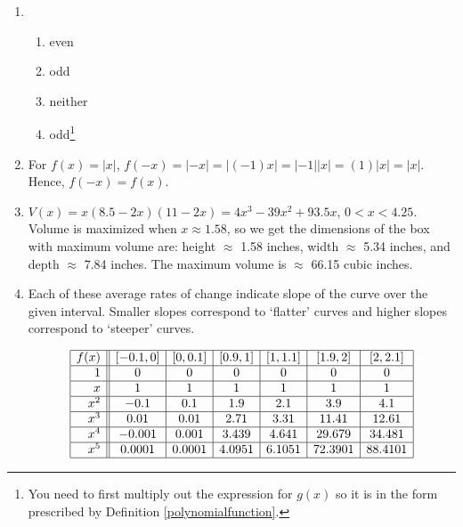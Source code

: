 \documentclass{ximera}
\begin{document}
\begin{enumerate}
\setcounter{enumi}{\value{HW}}

\addtocounter{enumi}{1}

\item  %
\begin{enumerate}

\item even

\item  odd

\item  neither

\item  odd\footnote{You need to first multiply out the expression for $g(x)$ so it is in the form prescribed by Definition \ref{polynomialfunction}.}

\end{enumerate}


\item For $f(x) = |x|$, $f(-x) = |-x| = |(-1) x|  = |-1| |x| = (1) |x| = |x|$.  Hence, $f(-x) = f(x)$.

\item  $V(x) = x(8.5-2x)(11-2x) = 4x^3-39x^2+93.5x$, $0 < x < 4.25$.  Volume is maximized when $x \approx 1.58$, so we get the dimensions of the box with maximum volume are: height $\approx$ 1.58 inches, width $\approx$ 5.34 inches, and depth $\approx$ 7.84 inches.  The maximum volume is $\approx$ 66.15 cubic inches.

\item  Each of these average rates of change indicate slope of the curve over the given interval.  Smaller slopes correspond to `flatter' curves and higher slopes correspond to `steeper' curves.

\[ \begin{array}{|r||c|c|c|c|c|c|}  \hline

 f(x) &  [-0.1, 0] & [0, 0.1] &[0.9, 1] & [1, 1.1] & [1.9, 2] & [2, 2.1]  \\ \hline
 1 &  0 &   0  & 0   & 0   & 0  & 0 \\  \hline
 x &  1 &   1  & 1   & 1   & 1  & 1 \\  \hline
 x^2 & -0.1 & 0.1 & 1.9 & 2.1 & 3.9 & 4.1  \\  \hline
 x^3 & 0.01  & 0.01 & 2.71 & 3.31 & 11.41 & 12.61 \\  \hline
 x^4&  -0.001 & 0.001 & 3.439 & 4.641 & 29.679 & 34.481 \\ \hline
 x^5 & 0.0001 & 0.0001 & 4.0951 & 6.1051 & 72.3901 & 88.4101 \\ \hline


\end{array}\]
\end{enumerate}
\end{document}
